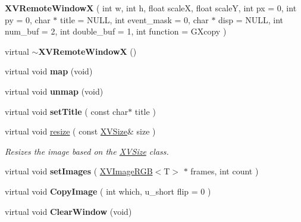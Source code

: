 \begin{CompactItemize}
\item 
\label{XVRemoteWindowX_a4}
\hypertarget{class_XVRemoteWindowX_a4}{
{\bf XVRemote\-Window\-X} ( int w, int h, float scale\-X, float scale\-Y, int px = 0, int py = 0, char $\ast$ title = NULL, int event\_\-mask = 0, char $\ast$ disp = NULL, int num\_\-buf = 2, int double\_\-buf = 1, int function = GXcopy )}

\item 
\label{XVRemoteWindowX_a5}
\hypertarget{class_XVRemoteWindowX_a5}{
virtual {\bf $\sim$XVRemote\-Window\-X} ()}

\item 
virtual void {\bf map} (void)
\item 
virtual void {\bf unmap} (void)
\item 
virtual void {\bf set\-Title} ( const char$\ast$ title )
\item 
virtual void \hyperlink{class_XVRemoteWindowX_a9}{resize} ( const \hyperlink{class_XVSize}{XVSize}\& size )
\begin{CompactList}\small\item\em Resizes the image based on the \hyperlink{class_XVSize}{XVSize} class.\item\end{CompactList}\item 
\label{XVRemoteWindowX_a10}
\hypertarget{class_XVRemoteWindowX_a10}{
virtual void {\bf set\-Images} ( \hyperlink{class_XVImageRGB}{XVImage\-RGB}$<$T$>$ $\ast$ frames, int count )}

\item 
\label{XVRemoteWindowX_a11}
\hypertarget{class_XVRemoteWindowX_a11}{
virtual void {\bf Copy\-Image} ( int which, u\_\-short flip = 0 )}

\item 
\label{XVRemoteWindowX_a12}
\hypertarget{class_XVRemoteWindowX_a12}{
virtual void {\bf Clear\-Window} (void)}


\end{CompactItemize}
